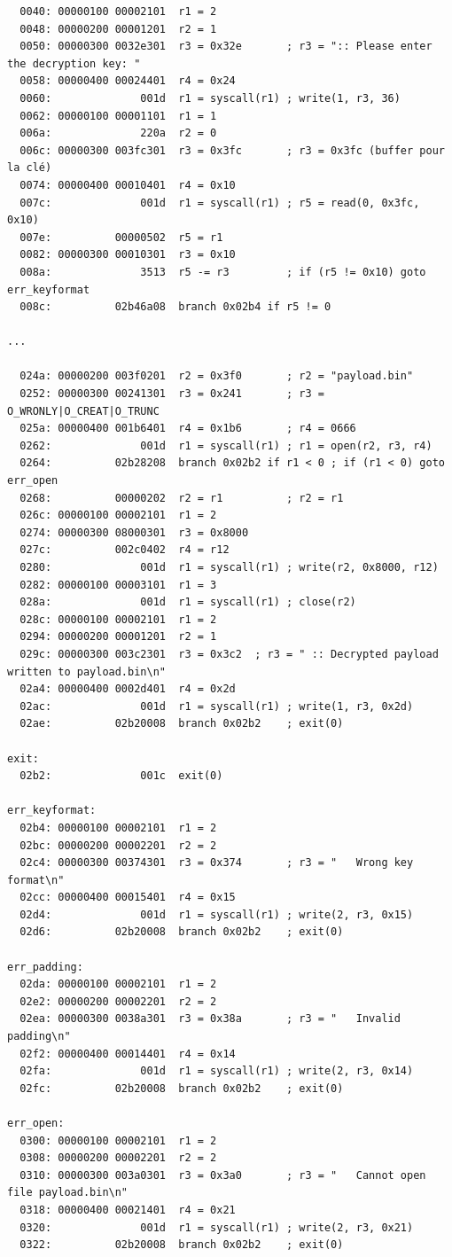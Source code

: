 \documentclass[a4paper,10pt]{article}
\begin{document}
\begin{verbatim}
  0040: 00000100 00002101  r1 = 2
  0048: 00000200 00001201  r2 = 1
  0050: 00000300 0032e301  r3 = 0x32e       ; r3 = ":: Please enter the decryption key: "
  0058: 00000400 00024401  r4 = 0x24
  0060:              001d  r1 = syscall(r1) ; write(1, r3, 36)
  0062: 00000100 00001101  r1 = 1
  006a:              220a  r2 = 0
  006c: 00000300 003fc301  r3 = 0x3fc       ; r3 = 0x3fc (buffer pour la clé)
  0074: 00000400 00010401  r4 = 0x10
  007c:              001d  r1 = syscall(r1) ; r5 = read(0, 0x3fc, 0x10)
  007e:          00000502  r5 = r1
  0082: 00000300 00010301  r3 = 0x10
  008a:              3513  r5 -= r3         ; if (r5 != 0x10) goto err_keyformat
  008c:          02b46a08  branch 0x02b4 if r5 != 0

...

  024a: 00000200 003f0201  r2 = 0x3f0       ; r2 = "payload.bin"
  0252: 00000300 00241301  r3 = 0x241       ; r3 = O_WRONLY|O_CREAT|O_TRUNC
  025a: 00000400 001b6401  r4 = 0x1b6       ; r4 = 0666
  0262:              001d  r1 = syscall(r1) ; r1 = open(r2, r3, r4)
  0264:          02b28208  branch 0x02b2 if r1 < 0 ; if (r1 < 0) goto err_open
  0268:          00000202  r2 = r1          ; r2 = r1
  026c: 00000100 00002101  r1 = 2
  0274: 00000300 08000301  r3 = 0x8000
  027c:          002c0402  r4 = r12
  0280:              001d  r1 = syscall(r1) ; write(r2, 0x8000, r12)
  0282: 00000100 00003101  r1 = 3
  028a:              001d  r1 = syscall(r1) ; close(r2)
  028c: 00000100 00002101  r1 = 2
  0294: 00000200 00001201  r2 = 1
  029c: 00000300 003c2301  r3 = 0x3c2  ; r3 = " :: Decrypted payload written to payload.bin\n"
  02a4: 00000400 0002d401  r4 = 0x2d
  02ac:              001d  r1 = syscall(r1) ; write(1, r3, 0x2d)
  02ae:          02b20008  branch 0x02b2    ; exit(0)

exit:
  02b2:              001c  exit(0)

err_keyformat:
  02b4: 00000100 00002101  r1 = 2
  02bc: 00000200 00002201  r2 = 2
  02c4: 00000300 00374301  r3 = 0x374       ; r3 = "   Wrong key format\n"
  02cc: 00000400 00015401  r4 = 0x15
  02d4:              001d  r1 = syscall(r1) ; write(2, r3, 0x15)
  02d6:          02b20008  branch 0x02b2    ; exit(0)

err_padding:
  02da: 00000100 00002101  r1 = 2
  02e2: 00000200 00002201  r2 = 2
  02ea: 00000300 0038a301  r3 = 0x38a       ; r3 = "   Invalid padding\n"
  02f2: 00000400 00014401  r4 = 0x14
  02fa:              001d  r1 = syscall(r1) ; write(2, r3, 0x14)
  02fc:          02b20008  branch 0x02b2    ; exit(0)

err_open:
  0300: 00000100 00002101  r1 = 2
  0308: 00000200 00002201  r2 = 2
  0310: 00000300 003a0301  r3 = 0x3a0       ; r3 = "   Cannot open file payload.bin\n"
  0318: 00000400 00021401  r4 = 0x21
  0320:              001d  r1 = syscall(r1) ; write(2, r3, 0x21)
  0322:          02b20008  branch 0x02b2    ; exit(0)
\end{verbatim}
\end{document}
